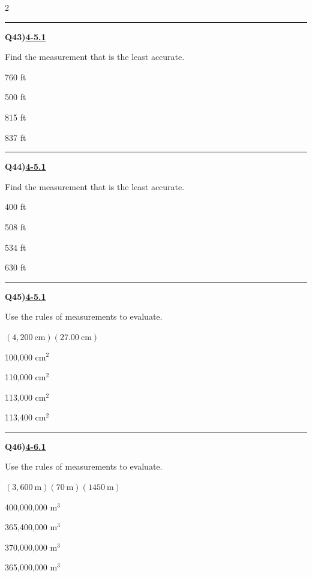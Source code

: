\documentclass[11pt]{article}
\newenvironment{Qbox}[2]{%
  \par\medskip\noindent\begin{minipage}{\linewidth}%
  \hrule\medskip%
  \textbf{Q#1)}\hfill\textbf{\underline{#2}}\par\smallskip%
}{\par\end{minipage}\par\medskip}
\begin{document}
\begin{multicols}{2}
\begin{Qbox}{43}{4-5.1}
Find the measurement that is the least accurate.
\begin{choices}
  \item 760 ft
  \item 500 ft
  \item 815 ft
  \item 837 ft
\end{choices}
\end{Qbox}

\begin{Qbox}{44}{4-5.1}
Find the measurement that is the least accurate.
\begin{choices}
  \item 400 ft
  \item 508 ft
  \item 534 ft
  \item 630 ft
\end{choices}
\end{Qbox}

\begin{Qbox}{45}{4-5.1}
Use the rules of measurements to evaluate.\par\medskip $(4{,}200\ \text{cm})(27.00\ \text{cm})$
\begin{choices}
  \item 100,000 cm$^2$
  \item 110,000 cm$^2$
  \item 113,000 cm$^2$
  \item 113,400 cm$^2$
\end{choices}
\end{Qbox}

\begin{Qbox}{46}{4-6.1}
Use the rules of measurements to evaluate.\par\medskip $(3{,}600\ \text{m})(70\ \text{m})(1450\ \text{m})$
\begin{choices}
  \item 400,000,000 m$^3$
  \item 365,400,000 m$^3$
  \item 370,000,000 m$^3$
  \item 365,000,000 m$^3$
\end{choices}
\end{Qbox}


\end{multicols}
\end{document}
